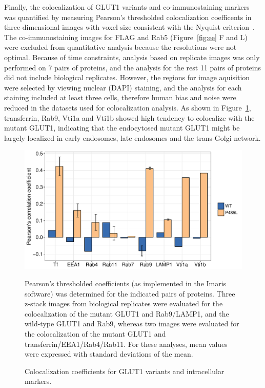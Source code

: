 Finally, the colocalization of GLUT1 variants and co-immunostaining markers was quantified by 
measuring Pearson's thresholded colocalization coefficents in three-dimensional images with voxel size consistent with the Nyquist criterion~\cite{Costes,Webb}. The co-immunostaining images for FLAG and Rab5 (Figure~\ref{fig:ee} F and L) were excluded from quantitative analysis because the resolutions were not optimal. Because of time constraints, analysis based on replicate images was only performed on 7 pairs of proteins, and the analysis for the rest 11 pairs of proteins did not include biological replicates. However, the regions for image aquisition were selected by viewing nuclear (DAPI) staining, and the analysis for each staining included at least three cells, therefore human bias and noise were reduced in the datasets used for colocalization analysis. As shown in Figure~\ref{fig:coloc}, transferrin, Rab9, Vti1a and Vti1b showed high tendency to colocalize with the mutant GLUT1, indicating that the endocytosed mutant GLUT1 might be largely localized in early endosomes, late endosomes and the trans-Golgi network.
\begin{figure}[h]
\centering
\includegraphics[scale=0.7]{Figures/coloc}
\caption{Colocalization coefficients for GLUT1 variants and intracellular markers.}
\vspace*{-3mm}
\small \justify
Pearson's thresholded coefficients (as implemented in the Imaris software) was determined for the indicated pairs of proteins. Three z-stack images from biological replicates were evaluated for the colocalization of the mutant GLUT1 and Rab9/LAMP1, and the wild-type GLUT1 and Rab9, whereas two images were evaluated for the colocalization of the mutant GLUT1 and transferrin/EEA1/Rab4/Rab11. For these analyses, mean values were expressed with standard deviations of the mean.
\label{fig:coloc}
\end{figure}

